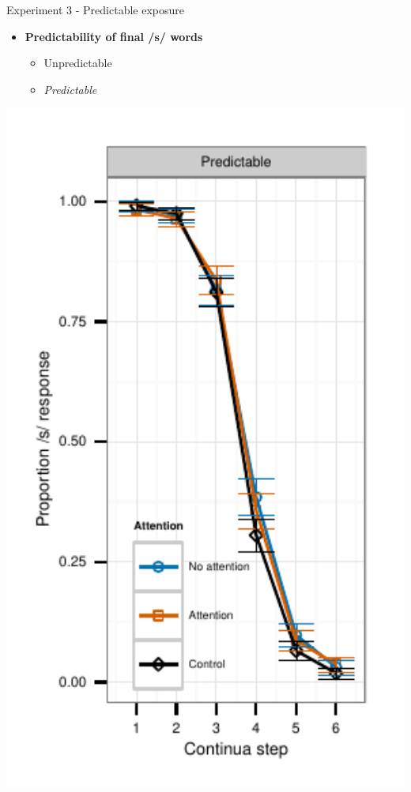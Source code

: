 \documentclass{beamer}
\begin{document}
\begin{frame}{Experiment 3 - Predictable exposure}
\begin{minipage}{0.45\textwidth}
\begin{itemize}
\item \textbf{Predictability of final /s/ words}
\begin{itemize}
\item Unpredictable
\item \emph{Predictable}
\end{itemize}
\end{itemize}
\end{minipage}
\hfill
\begin{minipage}{0.4\textwidth}
\includegraphics[width=1.0\textwidth]{graphs/exp3_categresults_present2-predictable}
\end{minipage}

\end{frame}
\end{document}
